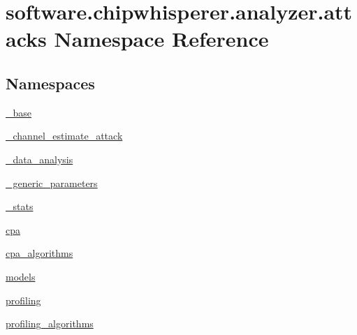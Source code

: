 \hypertarget{namespacesoftware_1_1chipwhisperer_1_1analyzer_1_1attacks}{}\section{software.\+chipwhisperer.\+analyzer.\+attacks Namespace Reference}
\label{namespacesoftware_1_1chipwhisperer_1_1analyzer_1_1attacks}
\subsection*{Namespaces}
\begin{DoxyCompactItemize}
\item 
 \hyperlink{namespacesoftware_1_1chipwhisperer_1_1analyzer_1_1attacks_1_1__base}{\+\_\+base}
\item 
 \hyperlink{namespacesoftware_1_1chipwhisperer_1_1analyzer_1_1attacks_1_1__channel__estimate__attack}{\+\_\+channel\+\_\+estimate\+\_\+attack}
\item 
 \hyperlink{namespacesoftware_1_1chipwhisperer_1_1analyzer_1_1attacks_1_1__data__analysis}{\+\_\+data\+\_\+analysis}
\item 
 \hyperlink{namespacesoftware_1_1chipwhisperer_1_1analyzer_1_1attacks_1_1__generic__parameters}{\+\_\+generic\+\_\+parameters}
\item 
 \hyperlink{namespacesoftware_1_1chipwhisperer_1_1analyzer_1_1attacks_1_1__stats}{\+\_\+stats}
\item 
 \hyperlink{namespacesoftware_1_1chipwhisperer_1_1analyzer_1_1attacks_1_1cpa}{cpa}
\item 
 \hyperlink{namespacesoftware_1_1chipwhisperer_1_1analyzer_1_1attacks_1_1cpa__algorithms}{cpa\+\_\+algorithms}
\item 
 \hyperlink{namespacesoftware_1_1chipwhisperer_1_1analyzer_1_1attacks_1_1models}{models}
\item 
 \hyperlink{namespacesoftware_1_1chipwhisperer_1_1analyzer_1_1attacks_1_1profiling}{profiling}
\item 
 \hyperlink{namespacesoftware_1_1chipwhisperer_1_1analyzer_1_1attacks_1_1profiling__algorithms}{profiling\+\_\+algorithms}
\end{DoxyCompactItemize}
